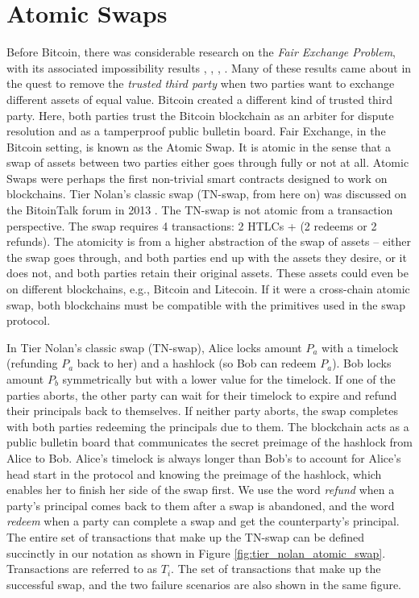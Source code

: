 \section{Atomic Swaps}
Before Bitcoin, there was considerable research on the \textit{Fair Exchange Problem}, with its associated impossibility results \cite{cleve1986limits}, \cite{fair_exchange_impossibility}, \cite{franklin1997fair}, \cite{asokan1998optimistic}. Many of these results came about in the quest to remove the \textit{trusted third party} when two parties want to exchange different assets of equal value. Bitcoin created a different kind of trusted third party. Here, both parties trust the Bitcoin blockchain as an arbiter for dispute resolution and as a tamperproof public bulletin board. Fair Exchange, in the Bitcoin setting, is known as the Atomic Swap. It is atomic in the sense that a swap of assets between two parties either goes through fully or not at all. Atomic Swaps were perhaps the first non-trivial smart contracts designed to work on blockchains. Tier Nolan's classic swap (TN-swap, from here on) was discussed on the BitoinTalk forum in 2013 \cite{atomic_swap}. The TN-swap is not atomic from a transaction perspective. The swap requires 4 transactions: 2 HTLCs + (2 redeems or 2 refunds). The atomicity is from a higher abstraction of the swap of assets -- either the swap goes through, and both parties end up with the assets they desire, or it does not, and both parties retain their original assets. These assets could even be on different blockchains, e.g., Bitcoin and Litecoin. If it were a cross-chain atomic swap, both blockchains must be compatible with the primitives used in the swap protocol. 

In Tier Nolan's classic swap (TN-swap), Alice locks amount $P_a$ with a timelock (refunding $P_a$ back to her) and a hashlock (so Bob can redeem $P_a$). Bob locks amount $P_b$ symmetrically but with a lower value for the timelock. If one of the parties aborts, the other party can wait for their timelock to expire and refund their principals back to themselves. If neither party aborts, the swap completes with both parties redeeming the principals due to them. The blockchain acts as a public bulletin board that communicates the secret preimage of the hashlock from Alice to Bob. Alice's timelock is always longer than Bob's to account for Alice's head start in the protocol and knowing the preimage of the hashlock, which enables her to finish her side of the swap first. We use the word \textit{refund} when a party's principal comes back to them after a swap is abandoned, and the word \textit{redeem} when a party can complete a swap and get the counterparty's principal. The entire set of transactions that make up the TN-swap can be defined succinctly in our notation as shown in Figure \ref{fig:tier_nolan_atomic_swap}. Transactions are referred to as $T_i$. The set of transactions that make up the successful swap, and the two failure scenarios are also shown in the same figure.

